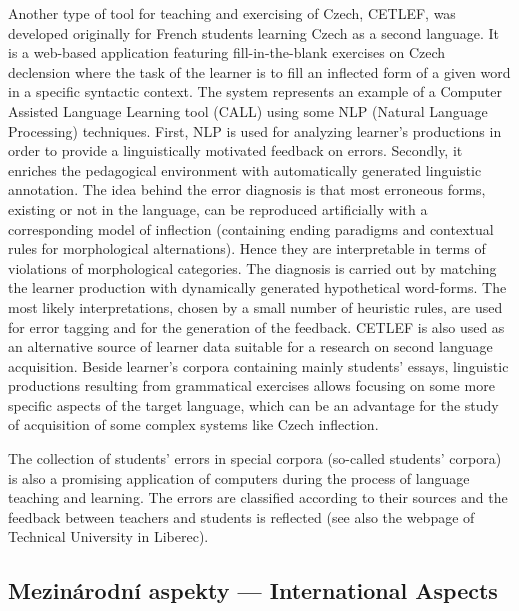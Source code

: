 \documentclass[]{../../metanetpaper}
\begin{document}
\begin{multicols}{2}
Another type of tool for teaching and exercising of Czech, CETLEF\cite{Note9en}, was developed originally for French students learning Czech as a second language. It is a web-based application featuring fill-in-the-blank exercises on Czech declension where the task of the learner is to fill an inflected form of a given word in a specific syntactic context. The system represents an example of a Computer Assisted Language Learning tool (CALL) using some NLP (Natural Language Processing) techniques. First, NLP is used for analyzing learner’s productions in order to provide a linguistically motivated feedback on errors. Secondly, it enriches the pedagogical environment with automatically generated linguistic annotation. The idea behind the error diagnosis is that most erroneous forms, existing or not in the language, can be reproduced artificially with a corresponding model of inflection (containing ending paradigms and contextual rules for morphological alternations). Hence they are interpretable in terms of violations of morphological categories. The diagnosis is carried out by matching the learner production with dynamically generated hypothetical word-forms. The most likely interpretations, chosen by a small number of heuristic rules, are used for error tagging and for the generation of the feedback. CETLEF is also used as an alternative source of learner data suitable for a research on second language acquisition. Beside learner’s corpora containing mainly students’ essays, linguistic productions resulting from grammatical exercises allows focusing on some more specific aspects of the target language, which can be an advantage for the study of acquisition of some complex systems like Czech inflection.

The collection of students’ errors in special corpora (so-called students’ corpora) is also a promising application of computers during the process of language teaching and learning. The errors are classified according to their sources and the feedback between teachers and students is reflected (see also the webpage of Technical University in Liberec\cite{Note10}).

\subsection{Mezinárodní aspekty --- International Aspects}


\end{multicols}
\end{document}
